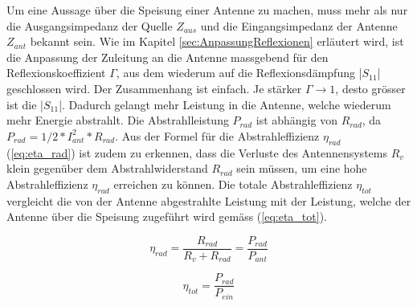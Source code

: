 Um eine Aussage über die Speisung einer Antenne zu machen, muss mehr als nur die Ausgangsimpedanz der Quelle $Z_{aus}$ und die Eingangsimpedanz der Antenne $Z_{ant}$ bekannt sein.  Wie im Kapitel \ref{sec:AnpassungReflexionen} erläutert wird, ist die Anpassung der Zuleitung an die Antenne massgebend für den Reflexionskoeffizient $\Gamma$, aus dem wiederum auf die Reflexionsdämpfung |$S_{11}$| geschlossen wird. Der Zusammenhang ist einfach. Je stärker $\Gamma\rightarrow 1$, desto grösser ist die |$S_{11}$|. Dadurch gelangt mehr Leistung in die Antenne, welche wiederum mehr Energie abstrahlt. Die Abstrahlleistung $P_{rad}$ ist abhängig von $R_{rad}$, da $P_{rad}=1/2*I_{ant}^2*R_{rad}$. Aus der Formel für die Abstrahleffizienz $\eta_{rad}$ (\ref{eq:eta_rad}) ist zudem zu erkennen, dass die Verluste des Antennensystems $R_v$ klein gegenüber dem Abstrahlwiderstand $R_{rad}$ sein müssen, um eine hohe Abstrahleffizienz $\eta_{rad}$ erreichen zu können. 
Die totale Abstrahleffizienz $\eta_{tot}$ vergleicht die von der Antenne abgestrahlte Leistung mit der Leistung, welche der Antenne über die Speisung zugeführt wird gemäss (\ref{eq:eta_tot}).

\begin{equation}
\eta_{rad}=\dfrac{R_{rad}}{R_v + R_{rad}}=\dfrac{P_{rad}}{P_{ant}}
\label{eq:eta_rad}
\end{equation}

\begin{equation}
\eta_{tot}=\dfrac{P_{rad}}{P_{ein}}
\label{eq:eta_tot}
\end{equation}

